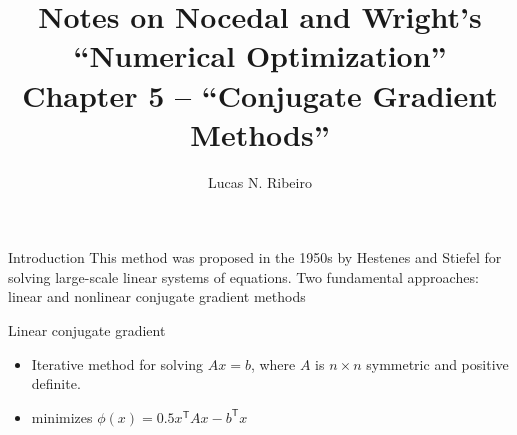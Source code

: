 \documentclass{beamer}
\title{Notes on Nocedal and Wright's ``Numerical Optimization''\\Chapter 5 --  ``Conjugate Gradient Methods''}
\author{Lucas N. Ribeiro}
\date{}
\newcommand{\tran}{\mathsf{T}}
\begin{document}
 
\frame{\titlepage}
 
\begin{frame}[allowframebreaks]{Introduction}
	This method was proposed in the 1950s by Hestenes and Stiefel for solving large-scale linear systems of equations. Two fundamental approaches: linear and nonlinear conjugate gradient methods
	\vspace{0.5cm}
	
	Linear conjugate gradient
	\begin{itemize}
		\item Iterative method for solving $Ax = b$, where $A$ is $n\times n$ symmetric and positive definite.
		\item minimizes $\phi(x) = 0.5 x^\tran A x - b^\tran x$
	\end{itemize}
	
\end{frame}
\end{document}
